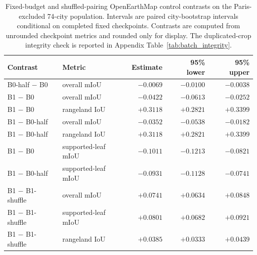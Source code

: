\begin{table}[H]
\centering
\caption{Fixed-budget and shuffled-pairing OpenEarthMap control contrasts on the Paris-excluded 74-city population. Intervals are paired city-bootstrap intervals conditional on completed fixed checkpoints. Contrasts are computed from unrounded checkpoint metrics and rounded only for display. The duplicated-crop integrity check is reported in Appendix Table~\ref{tab:batch_integrity}.}
\label{tab:oem-controls}
\small
\renewcommand{\arraystretch}{1.12}
\setlength{\tabcolsep}{4pt}
\begin{tabular*}{\linewidth}{@{\extracolsep{\fill}}llrrr@{}}
\toprule
Contrast & Metric & Estimate & 95\% lower & 95\% upper \\
\midrule
B0-half $-$ B0 & overall mIoU & $-0.0069$ & $-0.0100$ & $-0.0038$ \\
B1 $-$ B0 & overall mIoU & $-0.0422$ & $-0.0613$ & $-0.0252$ \\
B1 $-$ B0 & rangeland IoU & $+0.3118$ & $+0.2821$ & $+0.3399$ \\
B1 $-$ B0-half & overall mIoU & $-0.0352$ & $-0.0538$ & $-0.0182$ \\
B1 $-$ B0-half & rangeland IoU & $+0.3118$ & $+0.2821$ & $+0.3399$ \\
B1 $-$ B0 & supported-leaf mIoU & $-0.1011$ & $-0.1213$ & $-0.0821$ \\
B1 $-$ B0-half & supported-leaf mIoU & $-0.0931$ & $-0.1128$ & $-0.0741$ \\
B1 $-$ B1-shuffle & overall mIoU & $+0.0741$ & $+0.0634$ & $+0.0848$ \\
B1 $-$ B1-shuffle & supported-leaf mIoU & $+0.0801$ & $+0.0682$ & $+0.0921$ \\
B1 $-$ B1-shuffle & rangeland IoU & $+0.0385$ & $+0.0333$ & $+0.0439$ \\
\bottomrule
\end{tabular*}
\end{table}
